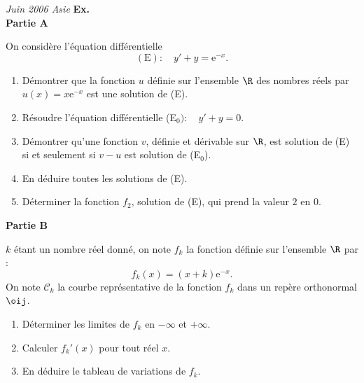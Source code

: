 \begin{exercice}
\textsl{Juin 2006 Asie} \textbf{Ex. } \\
\noindent\textbf{Partie A}

\noindent On consid\`ere l'\'equation diff\'erentielle 
\[(\text{E}) : \quad  y'+ y = \text{e}^{- x}.\]

\begin{enumerate}
\item  D\'emontrer que la fonction $u$ d\'efinie sur l'ensemble $\R$ des nombres r\'eels par $u(x) = x\text{e}^{- x}$ est une solution de (E).
\item R\'esoudre l'\'equation diff\'erentielle (E$_{0}) : \quad  y'+ y = 0$.
\item D\'emontrer qu'une fonction $v$, d\'efinie et d\'erivable sur $\R$, est solution de (E) si et seulement si $v - u$ est solution de (E$_{0}$).
\item En d\'eduire toutes les solutions de (E).
\item D\'eterminer la fonction $f_{2}$, solution de (E), qui prend la valeur $2$ en $0$.
\end{enumerate}
 
\medskip

\noindent \textbf{Partie B}

\noindent  $k$ \'etant un nombre r\'eel donn\'e, on note $f_{k}$ la fonction d\'efinie sur l'ensemble $\R$ par :
\[f_{k}(x) = (x + k)\text{e}^{- x}.\]
\noindent  On note $\mathcal{C}_{k}$ la courbe repr\'esentative de la fonction $f_{k}$ dans un rep\`ere orthonormal $\oij$.
\begin{enumerate}
\item  D\'eterminer les limites de $f_{k}$ en $-\infty$ et $+ \infty$.
\item Calculer $f_{k}'(x)$ pour tout r\'eel $x$.
\item En d\'eduire le tableau de variations de $f_{k}$.
 \end{enumerate}
\end{exercice}
